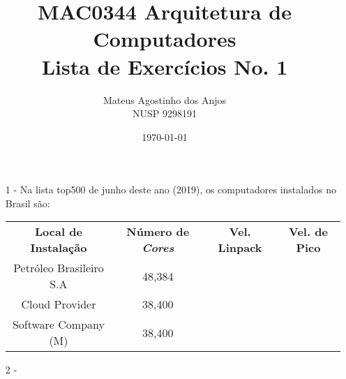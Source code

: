 \documentclass[12pt]{article}
\title{MAC0344 Arquitetura de Computadores\\
Lista de Exercícios No. 1
}
\author{Mateus Agostinho dos Anjos\\NUSP 9298191}
\date{\today}
\begin{document}
	\maketitle
	\begin{itemize}
		\item[1 -]
			Na lista top500 de junho deste ano (2019), os
			computadores instalados no Brasil são:\\
			\begin{table}[h!]
				\centering
				\begin{tabular}{c|c|c|c}
					\textbf{Local de Instalação} & \textbf{Número de \textit{Cores}} & \textbf{Vel. Linpack} & \textbf{Vel. de Pico}\\
					Petróleo Brasileiro S.A & 48,384 &  & \\
					Cloud Provider & 38,400 & & \\
					Software Company (M) & 38,400 & &\\
				\end{tabular}
			\end{table}
		\item[2 -]				
	\end{itemize}
		
\end{document}
